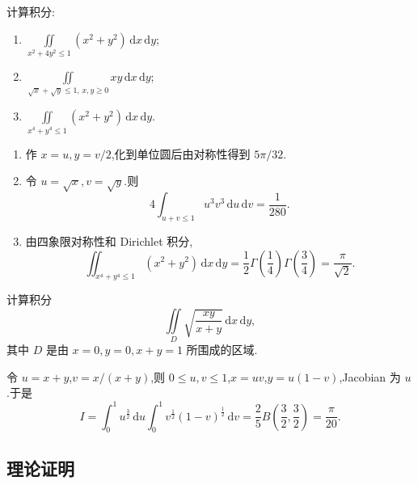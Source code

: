 \begin{example}
    计算积分:
    \begin{enumerate}
        \item $\displaystyle\iint\limits_{x^2+4y^2\leq1}(x^2+y^2)\,\mathrm{d}x\,\mathrm{d}y$;
        \item $\displaystyle\iint\limits_{\sqrt{x}+\sqrt{y}\leq1,\,x,y\geq0}xy\,\mathrm{d}x\,\mathrm{d}y$;
        \item $\displaystyle\iint\limits_{x^4+y^4\leq1}(x^2+y^2)\,\mathrm{d}x\,\mathrm{d}y$.
    \end{enumerate}
\end{example}
\exampleblank

\begin{solution}
    \leavevmode
    \begin{enumerate}
        \item 作 $x=u,y=v/2$,化到单位圆后由对称性得到 $5\pi/32$.
        \item 令 $u=\sqrt{x},v=\sqrt{y}$.则
              \[
                  4\int_{u+v\leq1}u^3v^3\,\mathrm{d}u\,\mathrm{d}v=\dfrac{1}{280}.
              \]
        \item 由四象限对称性和 Dirichlet 积分,
              \[
                  \displaystyle\iint_{x^4+y^4\leq1}(x^2+y^2)\,\mathrm{d}x\,\mathrm{d}y
                  =\dfrac{1}{2}\Gamma\left(\dfrac{1}{4}\right)\Gamma\left(\dfrac{3}{4}\right)
                  =\dfrac{\pi}{\sqrt2}.
              \]
    \end{enumerate}
\end{solution}

\begin{example}
    计算积分
    \[
        \displaystyle\iint\limits_D\sqrt{\dfrac{xy}{x+y}}\,\mathrm{d}x\,\mathrm{d}y,
    \]
    其中 $D$ 是由 $x=0,y=0,x+y=1$ 所围成的区域.
\end{example}
\exampleblank

\begin{solution}
    令 $u=x+y$,$v=x/(x+y)$,则 $0\leq u,v\leq1$,$x=uv$,$y=u(1-v)$,Jacobian 为 $u$.于是
    \[
        I=\int_0^1u^{\frac{3}{2}}\,\mathrm{d}u
        \int_0^1v^{\frac{1}{2}}(1-v)^{\frac{1}{2}}\,\mathrm{d}v
        =\dfrac{2}{5} B\left(\dfrac{3}{2},\dfrac{3}{2}\right)=\dfrac{\pi}{20}.
    \]
\end{solution}



\subsection{理论证明}

